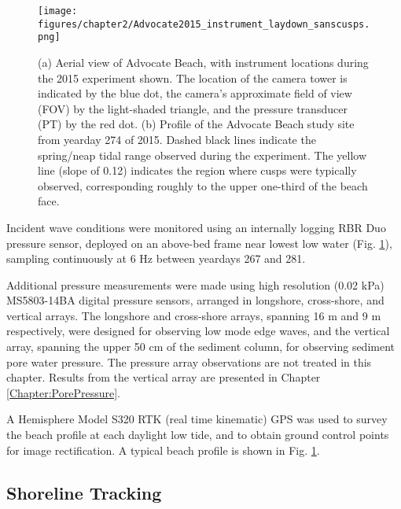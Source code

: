\begin{figure}[tbp]%
\begin{center}
 	\texttt{[image: figures/chapter2/Advocate2015\_instrument\_laydown\_sanscusps.png]}
	\caption[Beach profile with instrument locations during 2015 Advocate Beach experiment]{(a) Aerial view of Advocate Beach, with instrument locations during the 2015 experiment shown. The location of the camera tower is indicated by the blue dot, the camera's approximate field of view (FOV) by the light-shaded triangle, and the pressure transducer (PT) by the red dot. (b) Profile of the Advocate Beach study site from yearday 274 of 2015. Dashed black lines indicate the spring/neap tidal range observed during the experiment. The yellow line (slope of 0.12) indicates the region where cusps were typically observed, corresponding roughly to the upper one-third of the beach face.}
	\label{fig:beach_profile}
\end{center}	
\end{figure}

Incident wave conditions were monitored using an internally logging RBR Duo pressure sensor, deployed on an above-bed frame near lowest low water (Fig. \ref{fig:beach_profile}), sampling continuously at 6 Hz between yeardays 267 and 281. 

Additional pressure measurements were made using high resolution (0.02 kPa) MS5803-14BA digital pressure sensors, arranged in longshore, cross-shore, and vertical arrays. The longshore and cross-shore arrays, spanning 16 m and 9 m respectively, were designed for observing low mode edge waves, and the vertical array, spanning the upper 50 cm of the sediment column, for observing sediment pore water pressure. The pressure array observations are not treated in this chapter. Results from the vertical array are presented in Chapter \ref{Chapter:PorePressure}.

A Hemisphere Model S320 RTK (real time kinematic) GPS was used to survey the beach profile at each daylight low tide, and to obtain ground control points for image rectification. A typical beach profile is shown in Fig. \ref{fig:beach_profile}. 


\subsection{Shoreline Tracking}\label{subsec:Tracking}

